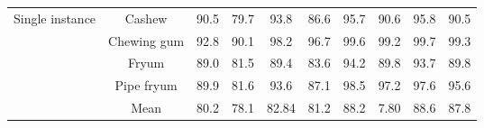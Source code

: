 \documentclass[runningheads]{llncs}
\begin{document}
\begin{table*}[!ht]
{\begin{tabular}{cc|cccc|cccc}
\multicolumn{1}{c|}{\multirow{4}{*}{Single instance}}    & Cashew      & 90.5  & 79.7                        & 93.8        & 86.6        & 95.7  & 90.6                        & 95.8       & 90.5        \\
\multicolumn{1}{c|}{}                                    & Chewing gum & 92.8  & 90.1                        & 98.2        & 96.7        & 99.6  & 99.2                        & 99.7       & 99.3        \\
\multicolumn{1}{c|}{}                                    & Fryum       & 89.0  & 81.5                        & 89.4        & 83.6        & 94.2  & 89.8                        & 93.7       & 89.8        \\
\multicolumn{1}{c|}{}                                    & Pipe fryum  & 89.9  & 81.6                        & 93.6        & 87.1        & 98.5  & 97.2                        & 97.6       & 95.6        \\ \hline
\multicolumn{1}{c|}{}                                    & Mean  & 80.2 & 78.1 & 82.84 & 81.2 & 88.2 & 7.80 & 88.6 & 87.8 \\ \hline
\end{tabular}}
\end{table*}
\end{document}
